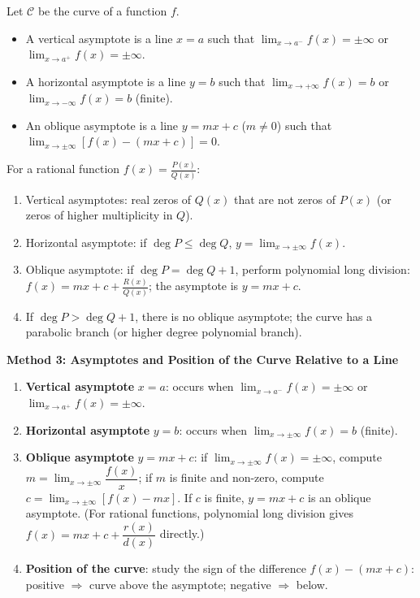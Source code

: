 \documentclass[11pt]{article}
\newcommand{\cle}[1]{{\popxbold\color{popdark}#1}}
\begin{document}
\begin{definition}[Asymptotes]
Let $\mathcal{C}$ be the curve of a function $f$.
\begin{itemize}
\item A \cle{vertical asymptote} is a line $x=a$ such that $\lim_{x\to a^-}f(x)=\pm\infty$ or $\lim_{x\to a^+}f(x)=\pm\infty$.
\item A \cle{horizontal asymptote} is a line $y=b$ such that $\lim_{x\to+\infty}f(x)=b$ or $\lim_{x\to-\infty}f(x)=b$ (finite).
\item An \cle{oblique asymptote} is a line $y=mx+c$ ($m\neq0$) such that $\lim_{x\to\pm\infty}[f(x)-(mx+c)]=0$.
\end{itemize}
\end{definition}

\begin{aretenir}
For a rational function $f(x)=\frac{P(x)}{Q(x)}$:
\begin{enumerate}
\item Vertical asymptotes: real zeros of $Q(x)$ that are not zeros of $P(x)$ (or zeros of higher multiplicity in $Q$).
\item Horizontal asymptote: if $\deg P \leq \deg Q$, $y=\lim_{x\to\pm\infty}f(x)$.
\item Oblique asymptote: if $\deg P = \deg Q + 1$, perform polynomial long division: $f(x)=mx+c+\frac{R(x)}{Q(x)}$; the asymptote is $y=mx+c$.
\item If $\deg P > \deg Q + 1$, there is no oblique asymptote; the curve has a \cle{parabolic branch} (or higher degree polynomial branch).
\end{enumerate}
\end{aretenir}

\textbf{Method 3: Asymptotes and Position of the Curve Relative to a Line}\par

\begin{methode}
\begin{enumerate}
\item \textbf{Vertical asymptote} $x=a$: occurs when $\lim_{x\to a^-}f(x)=\pm\infty$ or $\lim_{x\to a^+}f(x)=\pm\infty$.
\item \textbf{Horizontal asymptote} $y=b$: occurs when $\lim_{x\to\pm\infty}f(x)=b$ (finite).
\item \textbf{Oblique asymptote} $y=mx+c$: if $\lim_{x\to\pm\infty}f(x)=\pm\infty$, compute $m=\lim_{x\to\pm\infty}\dfrac{f(x)}{x}$; if $m$ is finite and non-zero, compute $c=\lim_{x\to\pm\infty}[f(x)-mx]$. If $c$ is finite, $y=mx+c$ is an oblique asymptote. (For rational functions, polynomial long division gives $f(x)=mx+c+\dfrac{r(x)}{d(x)}$ directly.)
\item \textbf{Position of the curve}: study the sign of the difference $f(x)-(mx+c)$: positive $\Rightarrow$ curve above the asymptote; negative $\Rightarrow$ below.
\end{enumerate}
\end{methode}
\end{document}
